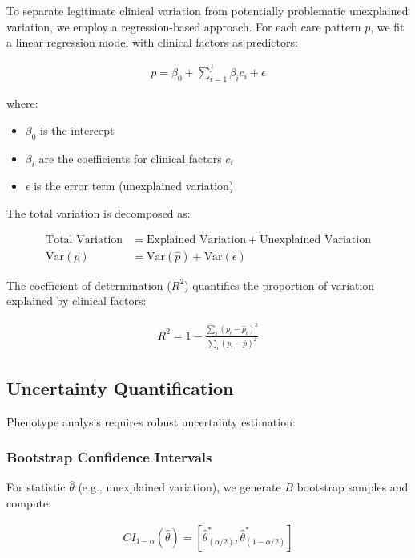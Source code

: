 \documentclass[12pt]{article}
\begin{document}
To separate legitimate clinical variation from potentially problematic unexplained variation, we employ a regression-based approach. For each care pattern $p$, we fit a linear regression model with clinical factors as predictors:

\begin{align}
p = \beta_0 + \sum_{i=1}^{j} \beta_i c_i + \epsilon
\end{align}

where:
\begin{itemize}
    \item $\beta_0$ is the intercept
    \item $\beta_i$ are the coefficients for clinical factors $c_i$
    \item $\epsilon$ is the error term (unexplained variation)
\end{itemize}

The total variation is decomposed as:

\begin{align}
\text{Total Variation} &= \text{Explained Variation} + \text{Unexplained Variation}\\
\text{Var}(p) &= \text{Var}(\hat{p}) + \text{Var}(\epsilon)
\end{align}

The coefficient of determination ($R^2$) quantifies the proportion of variation explained by clinical factors:

\begin{align}
R^2 = 1 - \frac{\sum_i (p_i - \hat{p}_i)^2}{\sum_i (p_i - \bar{p})^2}
\end{align}

\subsection{Uncertainty Quantification}

Phenotype analysis requires robust uncertainty estimation:

\subsubsection{Bootstrap Confidence Intervals}

For statistic $\hat{\theta}$ (e.g., unexplained variation), we generate $B$ bootstrap samples and compute:

\begin{align}
CI_{1-\alpha}(\hat{\theta}) = [\hat{\theta}^*_{(\alpha/2)}, \hat{\theta}^*_{(1-\alpha/2)}]
\end{align}
\end{document}
